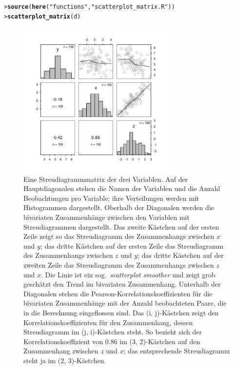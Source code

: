\documentclass[oneside, 10pt]{book}\usepackage[]{graphicx}\usepackage[]{xcolor}
\makeatletter
\newcommand{\hlstr}[1]{\textcolor[rgb]{0.192,0.494,0.8}{#1}}%
\newcommand{\hlstd}[1]{\textcolor[rgb]{0.345,0.345,0.345}{#1}}%
\newcommand{\hlkwd}[1]{\textcolor[rgb]{0.737,0.353,0.396}{\textbf{#1}}}%
\newenvironment{kframe}{%
 \def\at@end@of@kframe{}%
 \ifinner\ifhmode%
  \def\at@end@of@kframe{\end{minipage}}%
  \begin{minipage}{\columnwidth}%
 \fi\fi%
 \def\FrameCommand##1{\hskip\@totalleftmargin \hskip-\fboxsep
 \colorbox{shadecolor}{##1}\hskip-\fboxsep
     \hskip-\linewidth \hskip-\@totalleftmargin \hskip\columnwidth}%
 \MakeFramed {\advance\hsize-\width
   \@totalleftmargin\z@ \linewidth\hsize
   \@setminipage}}%
 {\par\unskip\endMakeFramed%
 \at@end@of@kframe}
\newenvironment{knitrout}{}{} %
\makeatother
\begin{document}
\begin{knitrout}
\color{fgcolor}\begin{kframe}
\begin{alltt}
\hlstd{> }\hlkwd{source}\hlstd{(}\hlkwd{here}\hlstd{(}\hlstr{"functions"}\hlstd{,} \hlstr{"scatterplot_matrix.R"}\hlstd{))}
\hlstd{> }\hlkwd{scatterplot_matrix}\hlstd{(d)}
\end{alltt}
\end{kframe}\begin{figure}[tp]

{\centering \includegraphics[width=0.7\textwidth]{figs/unnamed-chunk-304-1} 

}

\caption{Eine Streudiagrammmatrix der drei Variablen. Auf der Hauptdiagonalen stehen die Namen der Variablen und die Anzahl Beobachtungen pro Variable; ihre Verteilungen werden mit Histogrammen dargestellt. Oberhalb der Diagonalen werden die bivariaten Zusammenhänge zwischen den Variablen mit Streudiagrammen dargestellt. Das zweite Kästchen auf der ersten Zeile zeigt so das Streudiagramm des Zusammenhangs zwischen $x$ und $y$; das dritte Kästchen auf der ersten Zeile das Streudiagramm des Zusammenhangs zwischen $z$ und $y$; das dritte Kästchen auf der zweiten Zeile das Streudiagramm des Zusammenhangs zwischen $z$ und $x$. Die Linie ist ein sog.\ \textit{scatterplot smoother} und zeigt grob geschätzt den Trend im bivariaten Zusammenhang. Unterhalb der Diagonalen stehen die Pearson-Korrelationskoeffizienten für die bivariaten Zusammenhänge mit der Anzahl beobachteten Paare, die in die Berechnung eingeflossen sind. Das (i, j)-Kästchen zeigt den Korrelationskoeffizienten für den Zusammenhang, dessen Streudiagramm im (j, i)-Kästchen steht. So bezieht sich der Korrelationskoeffizient von 0.86 im (3, 2)-Kästchen auf den Zusammenhang zwischen $z$ und $x$; das entsprechende Streudiagramm steht ja im (2, 3)-Kästchen.\label{fig:streudiagramm}}\label{fig:unnamed-chunk-304}
\end{figure}

\end{knitrout}
\end{document}
